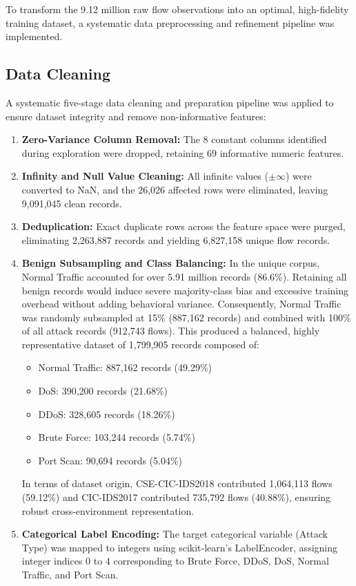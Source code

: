 \documentclass[12pt,a4paper]{report}
\begin{document}
To transform the 9.12 million raw flow observations into an optimal, high-fidelity training dataset, a systematic data preprocessing and refinement pipeline was implemented.

\subsection{Data Cleaning}

A systematic five-stage data cleaning and preparation pipeline was applied to ensure dataset integrity and remove non-informative features:

\begin{enumerate}
    \item \textbf{Zero-Variance Column Removal:} The 8 constant columns identified during exploration were dropped, retaining 69 informative numeric features.
    \item \textbf{Infinity and Null Value Cleaning:} All infinite values ($\pm\infty$) were converted to NaN, and the 26,026 affected rows were eliminated, leaving 9,091,045 clean records.
    \item \textbf{Deduplication:} Exact duplicate rows across the feature space were purged, eliminating 2,263,887 records and yielding 6,827,158 unique flow records.
    \item \textbf{Benign Subsampling and Class Balancing:} In the unique corpus, Normal Traffic accounted for over 5.91 million records (86.6\%). Retaining all benign records would induce severe majority-class bias and excessive training overhead without adding behavioral variance. Consequently, Normal Traffic was randomly subsampled at 15\% (887,162 records) and combined with 100\% of all attack records (912,743 flows). This produced a balanced, highly representative dataset of 1,799,905 records composed of:
    \begin{itemize}
        \item Normal Traffic: 887,162 records (49.29\%)
        \item DoS: 390,200 records (21.68\%)
        \item DDoS: 328,605 records (18.26\%)
        \item Brute Force: 103,244 records (5.74\%)
        \item Port Scan: 90,694 records (5.04\%)
    \end{itemize}
    In terms of dataset origin, CSE-CIC-IDS2018 contributed 1,064,113 flows (59.12\%) and CIC-IDS2017 contributed 735,792 flows (40.88\%), ensuring robust cross-environment representation.
    \item \textbf{Categorical Label Encoding:} The target categorical variable (Attack Type) was mapped to integers using scikit-learn's LabelEncoder, assigning integer indices $0$ to $4$ corresponding to Brute Force, DDoS, DoS, Normal Traffic, and Port Scan.
\end{enumerate}
\end{document}

